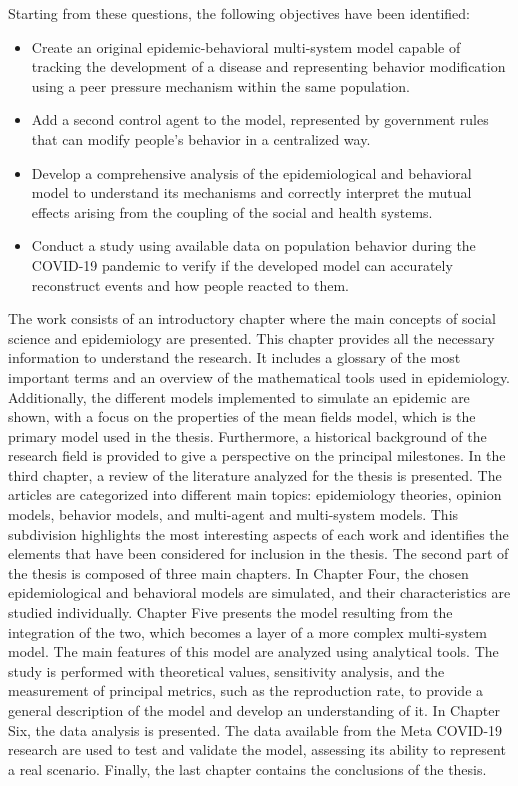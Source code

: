 Starting from these questions, the following objectives have been identified:
\begin{itemize}
	\item Create an original epidemic-behavioral multi-system model capable of tracking the development of a disease and representing behavior modification using a peer pressure mechanism within the same population.
	\item Add a second control agent to the model, represented by government rules that can modify people's behavior in a centralized way.
	\item Develop a comprehensive analysis of the epidemiological and behavioral model to understand its mechanisms and correctly interpret the mutual effects arising from the coupling of the social and health systems.
	\item Conduct a study using available data on population behavior during the COVID-19 pandemic to verify if the developed model can accurately reconstruct events and how people reacted to them.
\end{itemize}
The work consists of an introductory chapter where the main concepts of social science and epidemiology are presented. This chapter provides all the necessary information to understand the research. It includes a glossary of the most important terms and an overview of the mathematical tools used in epidemiology. Additionally, the different models implemented to simulate an epidemic are shown, with a focus on the properties of the mean fields model, which is the primary model used in the thesis. Furthermore, a historical background of the research field is provided to give a perspective on the principal milestones.
In the third chapter, a review of the literature analyzed for the thesis is presented. The articles are categorized into different main topics: epidemiology theories, opinion models, behavior models, and multi-agent and multi-system models. This subdivision highlights the most interesting aspects of each work and identifies the elements that have been considered for inclusion in the thesis.
The second part of the thesis is composed of three main chapters. In Chapter Four, the chosen epidemiological and behavioral models are simulated, and their characteristics are studied individually. Chapter Five presents the model resulting from the integration of the two, which becomes a layer of a more complex multi-system model. The main features of this model are analyzed using analytical tools. The study is performed with theoretical values, sensitivity analysis, and the measurement of principal metrics, such as the reproduction rate, to provide a general description of the model and develop an understanding of it.
In Chapter Six, the data analysis is presented. The data available from the Meta COVID-19 research are used to test and validate the model, assessing its ability to represent a real scenario. Finally, the last chapter contains the conclusions of the thesis.
 

